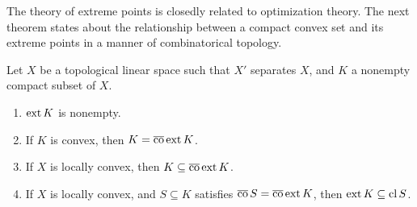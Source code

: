 The theory of extreme points is closedly related to optimization theory. The next theorem states about the relationship between a compact convex set and its extreme points in a manner of combinatorical topology.

\begin{theorem}
  Let $X$ be a topological linear space such that $X'$ separates $X$, and $K$ a nonempty compact subset of $X$.
  \begin{enumerate}
    \item $\operatorname{ext} K$ is nonempty.
    \item If $K$ is convex, then $K=\operatorname{\overline{co}}\operatorname{ext} K$.
    \item If $X$ is locally convex, then $K\subseteq \operatorname{\overline{co}}\operatorname{ext} K$.
    \item If $X$ is locally convex, and $S\subseteq K$ satisfies $\operatorname{\overline{co}} S=\operatorname{\overline{co}} \operatorname{ext} K$, then $\operatorname{ext} K\subseteq\operatorname{cl} S$.
  \end{enumerate}
\end{theorem}

